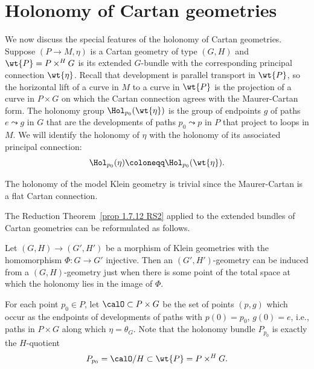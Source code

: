 \section{Holonomy of Cartan geometries}


We now discuss the special features of the holonomy of Cartan geometries. Suppose $(P\to M,\eta)$ is a Cartan geometry of type $(G,H)$ and $\wt{P}=P\times^H G$ is its extended $G$-bundle with the corresponding principal connection $\wt{\eta}$. Recall that development is parallel transport in $\wt{P}$, so the horizontal lift of a curve in $M$ to a curve in $\wt{P}$ is the projection of a curve in $P\times G$ on which the Cartan connection agrees with the Maurer-Cartan form. The holonomy group $\Hol_{p_0}(\wt{\eta})$ is the group of endpoints $g$ of paths $e\leadsto g$ in $G$ that are the developments of paths $p_0\leadsto p$ in $P$ that project to loops in $M$. We will identify the holonomy of $\eta$ with the holonomy of its associated principal connection:
\[\Hol_{p_0}(\eta)\coloneqq \Hol_{p_0}(\wt{\eta}).\]

\begin{example}
    The holonomy of the model Klein geometry is trivial since the Maurer-Cartan is a flat Cartan connection.
\end{example}

The Reduction Theorem~\ref{prop 1.7.12 RS2} applied to the extended bundles of Cartan geometries can be reformulated as follows.

\begin{thm}\label{thm 16.30 McKay}
    Let $(G,H)\to (G',H')$ be a morphism of Klein geometries with the homomorphism $\Phi:G\to G'$ injective. Then an $(G',H')$-geometry can be induced from a $(G,H)$-geometry just when there is some point of the total space at which the holonomy lies in the image of $\Phi$.
\end{thm}

For each point $p_0\in P$, let $\calO\subset P\times G$ be the set of points $(p,g)$ which occur as the endpoints of developments of paths with $p(0)=p_0$, $g(0)=e$, i.e., paths in $P\times G$ along which $\eta=\theta_G$. Note that the holonomy bundle $P_{p_0}$ is exactly the $H$-quotient 
\[P_{p_0}=\calO\slash H\subset \wt{P}=P\times^H G.\]

